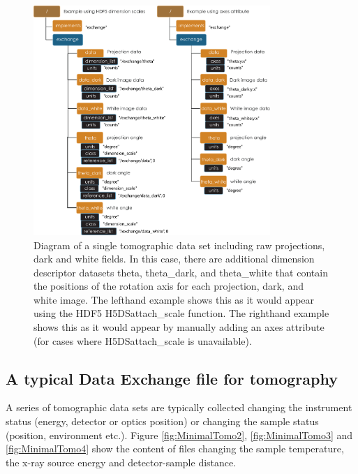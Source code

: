 \begin{figure}[h!]
\centering
\includegraphics[width=0.8\textwidth]{figures/dx_MinimalTomo1.pdf}
\caption{Diagram of a single tomographic data set including raw 
projections, dark and white fields. In this case, there are additional dimension descriptor
datasets theta, theta\_dark, and theta\_white that contain the positions of the rotation axis
for each projection, dark, and white image. The lefthand example shows this as it would
appear using the HDF5 H5DSattach\_scale function. The righthand example shows this as it would
appear by manually adding an axes attribute (for cases where H5DSattach\_scale is unavailable).}


\label{fig:MinimalTomo1}
\end{figure}

\subsection{A typical Data Exchange file for tomography}
A series of tomographic data sets are typically collected changing the instrument status (energy, detector or 
optics position) or changing the sample status (position, environment etc.). Figure \ref{fig:MinimalTomo2}, 
\ref{fig:MinimalTomo3} and \ref{fig:MinimalTomo4}  show the content of files changing the sample 
temperature, the x-ray source energy and detector-sample distance. 

